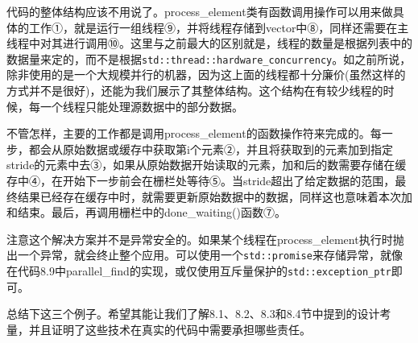 代码的整体结构应该不用说了。process\_element类有函数调用操作可以用来做具体的工作①，就是运行一组线程⑨，并将线程存储到vector中⑧，同样还需要在主线程中对其进行调用⑩。这里与之前最大的区别就是，线程的数量是根据列表中的数据量来定的，而不是根据\texttt{std::thread::hardware\_concurrency}。如之前所说，除非使用的是一个大规模并行的机器，因为这上面的线程都十分廉价(虽然这样的方式并不是很好)，还能为我们展示了其整体结构。这个结构在有较少线程的时候，每一个线程只能处理源数据中的部分数据。

不管怎样，主要的工作都是调用process\_element的函数操作符来完成的。每一步，都会从原始数据或缓存中获取第i个元素②，并且将获取到的元素加到指定stride的元素中去③，如果从原始数据开始读取的元素，加和后的数需要存储在缓存中④，在开始下一步前会在栅栏处等待⑤。当stride超出了给定数据的范围，最终结果已经存在缓存中时，就需要更新原始数据中的数据，同样这也意味着本次加和结束。最后，再调用栅栏中的done\_waiting()函数⑦。

注意这个解决方案并不是异常安全的。如果某个线程在process\_element执行时抛出一个异常，就会终止整个应用。可以使用一个\texttt{std::promise}来存储异常，就像在代码8.9中parallel\_find的实现，或仅使用互斥量保护的\texttt{std::exception\_ptr}即可。

总结下这三个例子。希望其能让我们了解8.1、8.2、8.3和8.4节中提到的设计考量，并且证明了这些技术在真实的代码中需要承担哪些责任。


